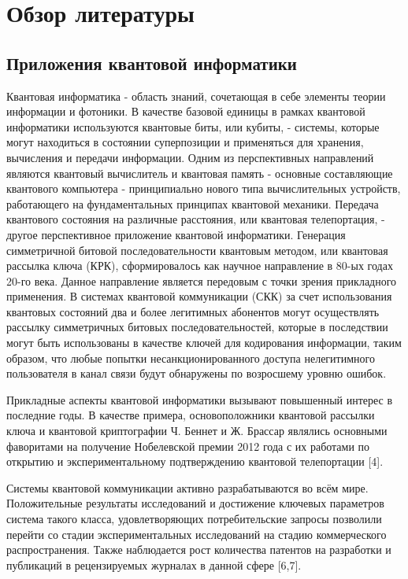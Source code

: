 \chapter{Обзор литературы} \label{ch:ch1}
\section{Приложения квантовой информатики} \label{sec:ch1/sec1}

Квантовая информатика - область знаний, сочетающая в себе элементы теории информации и фотоники. В качестве базовой единицы в рамках квантовой информатики используются квантовые биты, или кубиты, - системы, которые могут находиться в состоянии суперпозиции и применяться для хранения, вычисления и передачи информации. Одним из перспективных направлений являются квантовый вычислитель и квантовая память - основные составляющие квантового компьютера - принципиально нового типа вычислительных устройств, работающего на фундаментальных принципах квантовой механики. Передача квантового состояния на различные расстояния, или квантовая телепортация, - другое перспективное приложение квантовой информатики. Генерация симметричной битовой последовательности квантовым методом, или квантовая рассылка ключа (КРК), сформировалось как научное направление в 80-ых годах 20-го века. Данное направление является передовым с точки зрения прикладного применения. В системах квантовой коммуникации (СКК) за счет использования квантовых состояний два и более легитимных абонентов могут осуществлять рассылку симметричных битовых последовательностей, которые в последствии могут быть использованы в качестве ключей для кодирования информации, таким образом, что любые попытки несанкционированного доступа нелегитимного пользователя в канал связи будут обнаружены по возросшему уровню ошибок.


Прикладные аспекты квантовой информатики вызывают повышенный интерес в последние годы. В качестве примера, основоположники квантовой рассылки ключа и квантовой криптографии Ч. Беннет и Ж. Брассар являлись основными фаворитами на получение Нобелевской премии 2012 года с их работами по открытию и экспериментальному подтверждению квантовой телепортации [4].  

Системы квантовой коммуникации активно разрабатываются во всём мире. Положительные результаты исследований и достижение ключевых параметров система такого класса, удовлетворяющих потребительские запросы позволили перейти со стадии экспериментальных исследований на стадию коммерческого распространения. Также наблюдается рост количества патентов на разработки и публикаций в рецензируемых журналах в данной сфере [6,7].

